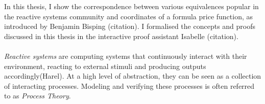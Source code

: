 %
\begin{isabellebody}%
%
%
\isadelimtheory
%
\endisadelimtheory
%
\isatagtheory
%
\endisatagtheory
{\isafoldtheory}%
%
\isadelimtheory
%
\endisadelimtheory
%
\isadelimdocument
%
\endisadelimdocument
%
\isatagdocument
%
\isamarkuptrue%
%
\endisatagdocument
{\isafolddocument}%
%
\isadelimdocument
%
\endisadelimdocument
%
\begin{isamarkuptext}%
In this thesis, I show the correspondence between various equivalences popular in the reactive
systems community and coordinates of a formula price function, as introduced by Benjamin Bisping (citation).
I formalised the concepts and proofs discussed in this thesis in the interactive proof assistant Isabelle (citation).
\\\\
\textit{Reactive systems} are computing systems that continuously interact with their environment, reacting to external stimuli and producing outputs accordingly(Harel).
At a high level of abstraction, they can be seen as a collection of interacting processes. Modeling and verifying these processes is often referred to as \textit{Process Theory}. \\\\


\end{isamarkuptext}
\end{isabellebody}

